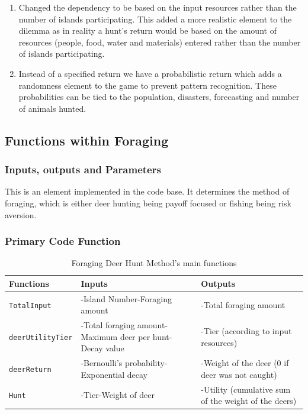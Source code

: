 \begin{enumerate}
    \item Changed the dependency to be based on the input resources rather than the number of islands participating. This added a more realistic element to the dilemma as in reality a hunt’s return would be based on the amount of resources (people, food, water and materials) entered rather than the number of islands participating.
    \item Instead of a specified return we have a probabilistic return which adds a randomness element to the game to prevent pattern recognition. These probabilities can be tied to the population, disasters, forecasting and number of animals hunted.  
\end{enumerate}

\newpage
\subsection{Functions within Foraging}
\subsubsection{Inputs, outputs and Parameters}

This is an element implemented in the code base. It determines the method of foraging, which is either deer hunting being payoff focused or fishing being risk aversion.\\


\subsubsection{Primary Code Function}

\begin{table}[h]
\begin{center}
\begin{tabular}{|p{1.5in}|p{1.5in}|p{1.5in}|} \hline
\textbf{Functions} & \textbf{Inputs} & \textbf{Outputs} \\ \hline
\texttt{TotalInput} & -Island Number\newline -Foraging amount & -Total foraging amount \\ \hline
\texttt{deerUtilityTier} & -Total foraging amount\newline -Maximum deer per hunt\newline -Decay value & -Tier (according to input resources) \\ \hline
\texttt{deerReturn} & -Bernoulli's probability\newline -Exponential decay & -Weight of the deer (0 if deer was not caught) \\ \hline
\texttt{Hunt} & -Tier\newline -Weight of deer & -Utility (cumulative sum of the weight of the deers) \\ \hline
\end{tabular}
\caption{\label{tab:table-name}Foraging Deer Hunt Method's main functions}
\end{center}
\end{table}

